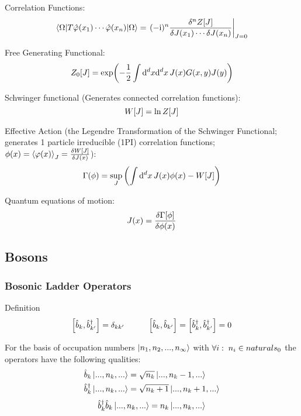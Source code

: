 			\noindent
			Correlation Functions:
			\begin{equation}
				\mel**{\Omega}{T \hat{\varphi}(x_1) \dotsb \hat{\varphi}(x_n)}{\Omega} = \eval{(-\i)^{n} \frac{\delta^n Z[J]}{\delta J(x_1) \dotsb \delta J(x_n)}}_{J=0}
			\end{equation}

			\noindent
			Free Generating Functional:
			\begin{equation}
				Z_0\qty[J] = \exp(-\frac{1}{2}\int\dd^d x \dd^d x\, J(x) G(x,y)J(y))
			\end{equation}

			\noindent
			Schwinger functional (Generates connected correlation functions):
			\begin{equation}
				W\qty[J] = \ln Z\qty[J]
			\end{equation}

			\noindent
			Effective Action (\ie the Legendre Transformation of the Schwinger Functional; generates 1 particle irreducible (1PI) correlation functions; $\phi(x) = \Avg{\varphi(x)}_J = \fdv{W\qty[J]}{J(x)}$):
			\begin{equation}
				\Gamma(\phi) = \sup_{J} \qty( \int \dd^d x \, J(x) \phi(x) - W[J])
			\end{equation}

			Quantum equations of motion:
			\begin{equation}
				J(x)=\fdv{\Gamma\qty[\phi]}{\phi(x)}
			\end{equation}

	\subsection{Bosons}
		\subsubsection{Bosonic Ladder Operators}
			\label{Sec:BosonicCreationAndAnnihilationOperators}
			Definition
			\begin{equation}
				\comm{\hat{b}_k}{\hat{b}_{k'}^\dagger} = \delta_{kk'}
				\hsp
				\comm{\hat{b}_k}{\hat{b}_{k'}} = \comm{\hat{b}_k^\dagger}{\hat{b}_{k'}^\dagger} = 0
			\end{equation}

			\noindent
			For the basis of occupation numbers $\Ket{n_1, n_2, ..., n_\infty}$ with $\forall i:\;n_i\in \\naturals _0$ the operators have the following qualities:
			\begin{equation}
				\begin{aligned}
					\hat{b}_k \Ket{...,n_k,...} &= \sqrt{n_k} \Ket{...,n_k-1,...} \\
					\hat{b}_k^\dagger \Ket{...,n_k,...} &= \sqrt{n_k+1} \Ket{...,n_k+1,...} \\
				\end{aligned}
			\end{equation}
			\begin{equation}
				\hat{b}_k^\dagger \hat{b}_k \Ket{...,n_k,...} = n_k \Ket{...,n_k,...}
			\end{equation}

